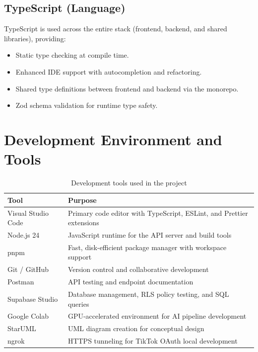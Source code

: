 \subsection{TypeScript (Language)}

TypeScript is used across the entire stack (frontend, backend, and shared libraries), providing:

\begin{itemize}
    \item Static type checking at compile time.
    \item Enhanced IDE support with autocompletion and refactoring.
    \item Shared type definitions between frontend and backend via the monorepo.
    \item Zod schema validation for runtime type safety.
\end{itemize}

\section{Development Environment and Tools}

\begin{table}[H]
\centering
\caption{Development tools used in the project}
\label{tab:tools}
\begin{tabularx}{\textwidth}{|l|X|}
\hline
\textbf{Tool} & \textbf{Purpose} \\
\hline
Visual Studio Code & Primary code editor with TypeScript, ESLint, and Prettier extensions \\
\hline
Node.js 24 & JavaScript runtime for the API server and build tools \\
\hline
pnpm & Fast, disk-efficient package manager with workspace support \\
\hline
Git / GitHub & Version control and collaborative development \\
\hline
Postman & API testing and endpoint documentation \\
\hline
Supabase Studio & Database management, RLS policy testing, and SQL queries \\
\hline
Google Colab & GPU-accelerated environment for AI pipeline development \\
\hline
StarUML & UML diagram creation for conceptual design \\
\hline
ngrok & HTTPS tunneling for TikTok OAuth local development \\
\hline
\end{tabularx}
\end{table}

